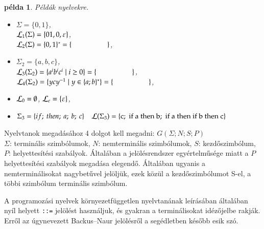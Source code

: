 \documentclass[a4paper]{article}
\newtheorem{pelda}{példa}[section]
\begin{document}
\begin{pelda}
  Példák nyelvekre.
\begin{itemize}
\item $\Sigma=\{0, 1\}$,\\
    ${\cal L}_1(\Sigma) = \{01, 0, \varepsilon \}$,\\
    ${\cal L}_2(\Sigma) = \{0, 1\}^* = \{ \hspace{5em}\}$,
\item $\Sigma_2=\{a, b, c\}$,\\
    ${\cal L}_3(\Sigma_2) = \{a^ib^ic^i  \mid i\ge 0\} = \{ \hspace{5em}\}$,\\
    ${\cal L}_4(\Sigma_2) = \{ycy^{-1} \mid y\in \{a; b\}^*\} = \{ \hspace{5em}\}$,
\item ${\cal L}_0 = \emptyset$,
	${\cal L}_e = \{\varepsilon \}$,
\item $\Sigma_3 = \{ if;\: then;\: a;\: b;\: c\} \quad
    {\cal L}(\Sigma_3)=\{\mbox{c;\: if a then b;\: if a then if b then c}\}$
\end{itemize}
\end{pelda}

Nyelvtanok megadásához 4 dolgot kell megadni: $G(\Sigma; N; S; P)$\\
$\Sigma$: terminális szimbólumok, $N$: nemterminális szimbólumok, $S$: kezdőszimbólum, $P$: helyettesítési szabályok.
Általában a jelölésrendszer egyértelműsége miatt a $P$ helyettesítési
szabályok megadása elegendő. Általában ugyanis a nemterminálisokat
nagybetűvel jelöljük, ezek közül a kezdőszimbólumot S-el, a többi
szimbólum terminális szimbólum.

A programozási nyelvek környezetfüggetlen nyelvtanának leírásában
általában nyíl helyett \verb|::=| jelölést használjuk, és gyakran a
terminálisokat idézőjelbe rakják. Erről az úgynevezett Backus--Naur
jelölésről a segédletben később esik szó.
\end{document}
